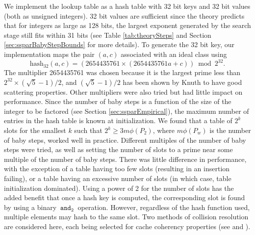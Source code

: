 \documentclass{ucalgthes1}
\theoremstyle{definition}
\newcommand{\band}{~\texttt{and}_\texttt{2}~}
\newcommand{\hash}{\textrm{hash}_{\textrm{32}}}
\begin{document}
We implement the lookup table as a hash table with 32 bit keys and 32 bit values (both as unsigned integers).  32 bit values are sufficient since the theory predicts that for integers as large as 128 bits, the largest exponent generated by the search stage still fits within 31 bits (see Table \ref{tab:theorySteps} and Section \ref{sec:ssparBabyStepBounds} for more details).  To generate the 32 bit key, our implementation maps the pair $(a, c)$ associated with an ideal class using
\[
	\hash(a, c) = (2654435761 \times (2654435761a + c)) \bmod 2^{32}.
\]
The multiplier 2654435761 was chosen because it is the largest prime less than $2^{32} \times (\sqrt 5 - 1)/2$, and $(\sqrt 5 - 1)/2$ has been shown by Knuth \cite[Section~6.4]{Knuth1998} to have good scattering properties.  Other multipliers were also tried but had little impact on performance.  Since the number of baby steps is a function of the size of the integer to be factored (see Section \ref{sec:ssparEmpirical}), the maximum number of entries in the hash table is known at initialization.  We found that a table of $2^k$ slots for the smallest $k$ such that $2^k \ge 3m\phi(P_2)$, where $m\phi(P_w)$ is the number of baby steps, worked well in practice.  Different multiples of the number of baby steps were tried, as well as setting the number of slots to a prime near some multiple of the number of baby steps.  There was little difference in performance, with the exception of a table having too few slots (resulting in an insertion failing), or a table having an excessive number of slots (in which case, table initialization dominated).  Using a power of 2 for the number of slots has the added benefit that once a hash key is computed, the corresponding slot is found by using a binary $\band$ operation.  However, regardless of the hash function used, multiple elements may hash to the same slot.  Two methods of collision resolution are considered here, each being selected for cache coherency properties (see \cite[Subsection~11.2]{Cormen2001} and \cite{Kuchling2008}).
\end{document}
